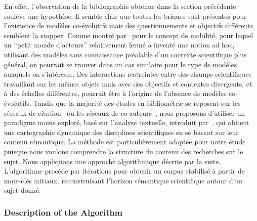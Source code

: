 {En effet, l'observation de la bibliographie obtenue dans la section précédente soulève une hypothèse. Il semble clair que toutes les briques sont présentes pour l'existence de modèles co-évolutifs mais des questionnements et objectifs différents semblent la stopper. Comme montré par~\cite{commenges:tel-00923682} pour le concept de mobilité, pour lequel un ``petit monde d'acteurs'' relativement fermé a inventé une notion ad hoc, utilisant des modèles sans connaissance préalable d'un contexte scientifique plus général, on pourrait se trouver dans un cas similaire pour le type de modèles auxquels on s'intéresse. Des interactions restreintes entre des champs scientifiques travaillant sur les mêmes objets mais avec des objectifs et contextes divergents, et à des échelles différentes, pourrait être à l'origine de l'absence de modèles co-évolutifs.
Tandis que la majorité des études en bibliométrie se reposent sur les réseaux de citation~\cite{2013arXiv1310.8220N} ou les réseaux de co-auteurs~\cite{2014arXiv1402.7268S}, nous proposons d'utiliser un paradigme moins exploré, basé sur l'analyse textuelle, introduit par~\cite{chavalarias2013phylomemetic}, qui obtient une cartographie dynamique des disciplines scientifiques en se basant sur leur contenu sémantique. La méthode est particulièrement adaptée pour notre étude puisque nous voulons comprendre la structure du contenu des recherches sur le sujet. Nous appliquons une approche algorithmique décrite par la suite. L'algorithme procède par itérations pour obtenir un corpus stabilisé à partir de mots-clés initiaux, reconstruisant l'horizon sémantique scientifique autour d'un sujet donné.
}


\subsubsection{Description of the Algorithm}


